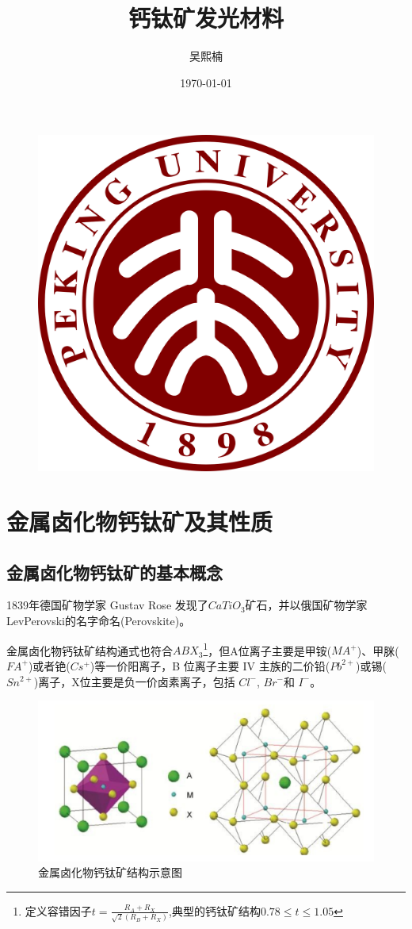 \documentclass{beamer}[fontset=windows]
\author{吴熙楠}
\title{钙钛矿发光材料}
\institute{北京大学物理学院}
\date{\today}
\begin{document}
	
	\kaishu
	\begin{frame}
		\titlepage
    \begin{figure}[htpb]
    	\begin{center}
    		\includegraphics[width=0.2\linewidth]{pic/PKU_logo.png}
    	\end{center}
    \end{figure}
	\end{frame}
	
	\begin{frame}
		\tableofcontents[sectionstyle=show,subsectionstyle=show/shaded/hide,subsubsectionstyle=show/shaded/hide]
	\end{frame}
\section{金属卤化物钙钛矿及其性质}
\subsection{金属卤化物钙钛矿的基本概念}
\begin{frame}
	\begin{itemize}\small{
		\item 1839年德国矿物学家 Gustav Rose 发现了$ CaTiO_{3}$矿石，并以俄国矿物学家 LevPerovski的名字命名(Perovskite)。
		\item 金属卤化物钙钛矿结构通式也符合$ABX_{3}$\footnote{定义容错因子$t=\frac{R_{A}+R_{X}}{\sqrt{2}(R_{B}+R_{X})}$,典型的钙钛矿结构$0.78\le t\le 1.05$}，但A位离子主要是甲铵($MA^{+}$)、甲脒($FA^{+}$)或者铯($Cs^{+}$)等一价阳离子，B 位离子主要 IV 主族的二价铅($Pb^{2+}$)或锡($Sn^{2+}$)离子，X位主要是负一价卤素离子，包括 $Cl^{-}$, $Br^{-}$和 $I^{-}$。}
	\end{itemize}
	\begin{figure}[H]
	\centering
	\hspace{2em}\includegraphics[width=.5\linewidth]{pic/1.png}
	\caption{金属卤化物钙钛矿结构示意图
	}
\end{figure}
\end{frame}
\end{document}
